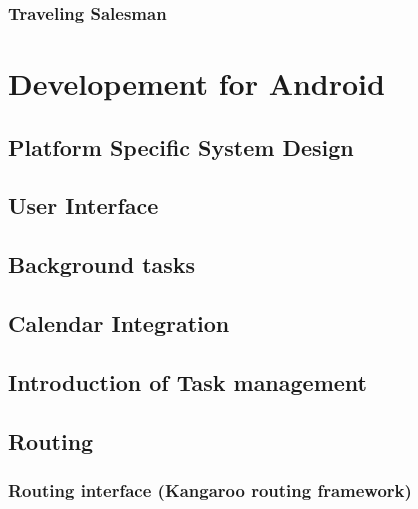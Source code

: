 \documentclass[11pt,a4paper]{scrreprt}
\begin{document}
	\subsection{Traveling Salesman}
	\label{sub:routing_tsm}
	
	

\chapter{Developement for Android} %
\label{chp:android}
%

	\section{Platform Specific System Design} %
	\label{sec:android_desing}
	
	
	
	\section{User Interface} %
	\label{sec:user_interface}
	
	
	\section{Background tasks} %
	\label{sec:android_integration}
	
	
	\section{Calendar Integration} %
	\label{sec:android_calendar}
	
	
	\section{Introduction of Task management} %
	\label{sec:android_task}
	
		
	\section{Routing}
	\label{sub:routing}
	
	\subsection{Routing interface (Kangaroo routing framework)} %
	\label{sub:routing_interface}
	
	
\end{document}
